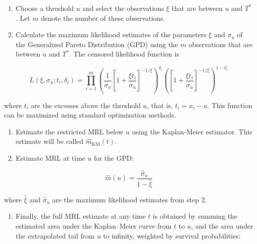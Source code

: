 \documentclass[
  onecolumn]{article}
\providecommand{\tightlist}{%
  \setlength{\itemsep}{0pt}\setlength{\parskip}{0pt}}
\begin{document}
\begin{enumerate}
\def\labelenumi{\arabic{enumi}.}
\tightlist
\item
  Choose a threshold \(u\) and select the observations \(\xi\) that are
  between \(u\) and \(T^*\). Let \(m\) denote the number of these
  observations.
\item
  Calculate the maximum likelihood estimates of the parameters \(\xi\)
  and \(\sigma_u\) of the Generalized Pareto Distribution (GPD) using
  the \(m\) observations that are between \(u\) and \(T^*\). The
  censored likelihood function is
\end{enumerate}

\begin{equation}
L(\xi, \sigma_u; t_i, \delta_i) = \prod_{i=1}^{m} \left( \frac{1}{\sigma_u} \left[ 1 + \frac{\xi t_i}{\sigma_u} \right]^{-1/\xi} \right)^{\delta_i} \left( \left[ 1 + \frac{\xi t_i}{\sigma_u} \right]^{-1/\xi} \right)^{1 - \delta_i} \label{eq:likelihood}
\end{equation}

where \(t_i\) are the excesses above the threshold \(u\), that is,
\(t_i = x_i - u\). This function can be maximized using standard
optimization methods.

\begin{enumerate}
\def\labelenumi{\arabic{enumi}.}
\setcounter{enumi}{2}
\tightlist
\item
  Estimate the restricted MRL below \(u\) using the Kaplan-Meier
  estimator. This estimate will be called \(\hat{m}_{\text{KM}}(t)\).
\item
  Estimate MRL at time \(u\) for the GPD:
\end{enumerate}

\begin{equation}
\hat{m}(u) = \frac{\hat{\sigma}_u}{1 - \hat{\xi}} \label{eq:mrl_u}
\end{equation}

where \(\hat{\xi}\) and \(\hat{\sigma}_u\) are the maximum likelihood
estimates from step 2.

\begin{enumerate}
\def\labelenumi{\arabic{enumi}.}
\setcounter{enumi}{4}
\tightlist
\item
  Finally, the full MRL estimate at any time \(t\) is obtained by
  summing the estimated area under the Kaplan--Meier curve from \(t\) to
  \(u\), and the area under the extrapolated tail from \(u\) to
  infinity, weighted by survival probabilities:
\end{enumerate}
\end{document}
